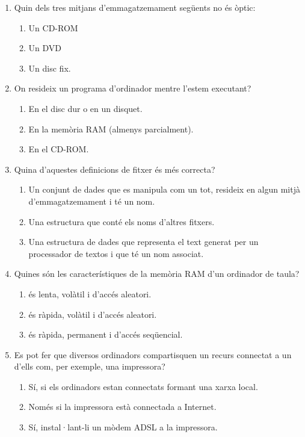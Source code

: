 \begin{enumerate}
\item Quin dels tres mitjans d'emmagatzemament següents no és òptic:
        \begin{enumerate}
        \item Un CD-ROM
        \item Un DVD
        \item Un disc fix.
        \end{enumerate}

\item On resideix un programa d'ordinador mentre  l'estem executant?
        \begin{enumerate}
        \item En el disc dur o en un disquet.
        \item En la memòria RAM (almenys parcialment).
        \item En el CD-ROM.
        \end{enumerate} 

\item Quina d'aquestes definicions de fitxer és més
        correcta?
        \begin{enumerate}
        \item Un conjunt de dades que es manipula com un tot, resideix
              en algun mitjà d'emmagatzemament i  
              té un nom.
        \item Una estructura que conté els noms d'altres fitxers.
        \item Una estructura de dades que representa el text generat
              per un processador de textos i que té un nom associat.
        \end{enumerate} 

\item Quines són les característiques de la memòria
      RAM d'un ordinador de taula?
       \begin{enumerate}
       \item és lenta, volàtil i d'accés aleatori.
       \item és ràpida, volàtil i d'accés aleatori.
       \item és ràpida, permanent i d'accés seqüencial.
       \end{enumerate}

     \item Es pot fer que diversos ordinadors compartisquen un recurs
       connectat a un d'ells com, per exemple, una impressora?
\begin{enumerate}
\item Sí, si els ordinadors estan connectats formant una xarxa local.
\item Només si la impressora està connectada a Internet.
\item Sí, instal·lant-li un mòdem ADSL a la impressora.
\end{enumerate} 


\end{enumerate}

